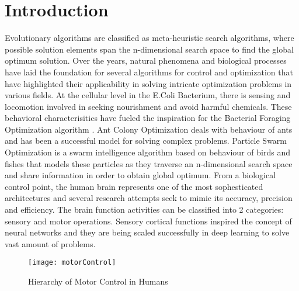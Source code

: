 \section{Introduction}

Evolutionary algorithms are classified as meta-heuristic search algorithms, where possible solution elements span the n-dimensional search space to find the global optimum solution. Over the years, natural phenomena and biological processes have laid the foundation for several algorithms for control and optimization that have highlighted their applicability in solving intricate optimization problems in various fields. At the cellular level in the E.Coli Bacterium, there is sensing and locomotion involved in seeking nourishment and avoid harmful chemicals. These behavioral characterisitics have fueled the inspiration for the Bacterial Foraging Optimization algorithm \cite{passino2002biomimicry}\cite{onwubolu2013new}. Ant Colony Optimization \cite{dorigo2010ant} deals with behaviour of ants and has been a successful model for solving complex problems. Particle Swarm Optimization \cite{kennedy2011particle} is a swarm intelligence algorithm based on behaviour of birds and fishes that models these particles as they traverse an n-dimensional search space and share information in order to obtain global optimum.
From a biological control point, the human brain represents one of the most sophesticated architectures and several research attempts seek to mimic its accuracy, precision and efficiency. The brain function activities can be classified into 2 categories: sensory and motor operations. Sensory cortical functions inspired the concept of neural networks and they are being scaled successfully in deep learning to solve vast amount of problems.

\begin{figure}[h!]
  \texttt{[image: motorControl]}
  \caption{Hierarchy of Motor Control in Humans}
  \label{fig:motorControl}
\end{figure}

